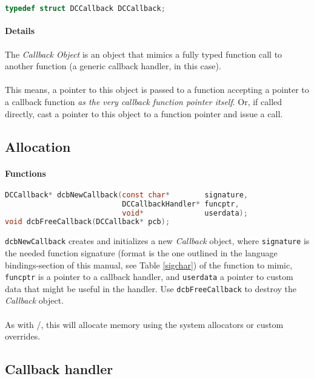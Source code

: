 \begin{lstlisting}[language=c]
typedef struct DCCallback DCCallback;
\end{lstlisting}

\paragraph{Details}
The \emph{Callback Object} is an object that mimics a fully typed function
call to another function (a generic callback handler, in this case).\\
\\
This means, a pointer to this object is passed to a function accepting a pointer
to a callback function \emph{as the very callback function pointer itself}.
Or, if called directly, cast a pointer to this object to a function pointer and
issue a call.


\subsection{Allocation}

\paragraph{Functions}

\begin{lstlisting}[language=c]
DCCallback* dcbNewCallback(const char*        signature,
                           DCCallbackHandler* funcptr,
                           void*              userdata);
void dcbFreeCallback(DCCallback* pcb);
\end{lstlisting}

\lstinline{dcbNewCallback} creates and initializes a new \emph{Callback} object,
where \lstinline{signature} is the needed function signature (format is the
one outlined in the language bindings-section of this manual, see Table \ref{sigchar})
of the function to mimic, \lstinline{funcptr} is a pointer to a callback handler,
and \lstinline{userdata} a pointer to custom data that might be useful in the
handler.
Use \lstinline{dcbFreeCallback} to destroy the \emph{Callback} object.\\
\\
As with /, this will allocate memory using the
system allocators or custom overrides.


\subsection{Callback handler}

